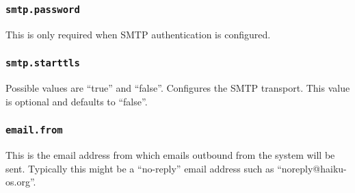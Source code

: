 \subsubsection{\tt smtp.password}

This is only required when SMTP authentication is configured.

\subsubsection{\tt smtp.starttls}

Possible values are ``true'' and ``false''.  Configures the SMTP transport.  This value is optional and defaults to ``false''.

\subsubsection{\tt email.from}

This is the email address from which emails outbound from the system will be sent.  Typically this might be a ``no-reply'' email address such as ``noreply@haiku-os.org''.